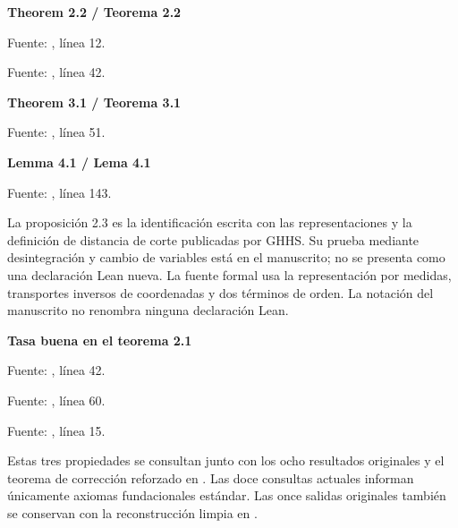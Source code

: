 \documentclass[spanish,11pt,a4paper]{article}
\begin{document}
\textbf{Theorem 2.2 / Teorema 2.2}


Fuente: , línea 12.


Fuente: , línea 42.

\textbf{Theorem 3.1 / Teorema 3.1}


Fuente: , línea 51.

\textbf{Lemma 4.1 / Lema 4.1}


Fuente: , línea 143.

La proposición 2.3 es la identificación escrita con las representaciones y la definición de distancia de corte publicadas por GHHS. Su prueba mediante desintegración y cambio de variables está en el manuscrito; no se presenta como una declaración Lean nueva. La fuente formal usa la representación por medidas, transportes inversos de coordenadas y dos términos de orden. La notación del manuscrito no renombra ninguna declaración Lean.

\textbf{Tasa buena en el teorema 2.1}


Fuente: , línea 42.


Fuente: , línea 60.


Fuente: , línea 15.

Estas tres propiedades se consultan junto con los ocho resultados originales y el teorema de corrección reforzado en . Las doce consultas actuales informan únicamente axiomas fundacionales estándar. Las once salidas originales también se conservan con la reconstrucción limpia en .
\end{document}
